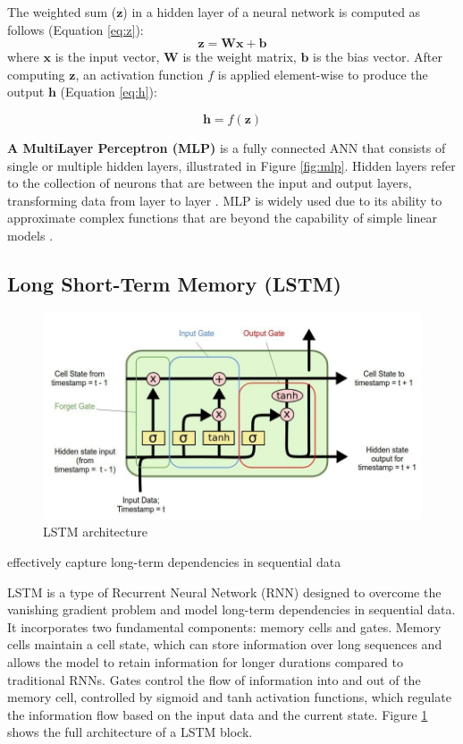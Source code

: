 The weighted sum (\( \mathbf{z} \)) in a hidden layer of a neural network is computed as follows (Equation \eqref{eq:z}):
\begin{equation}
    \label{eq:z}
    \mathbf{z} = \mathbf{W}\mathbf{x} + \mathbf{b}
\end{equation} where \( \mathbf{x} \) is the input vector, \( \mathbf{W} \) is the weight matrix, \( \mathbf{b} \) is the bias vector. After computing \( \mathbf{z} \), an activation function \( f \) is applied element-wise to produce the output \( \mathbf{h} \) (Equation \eqref{eq:h}):

\begin{equation}
    \label{eq:h}
    \mathbf{h} = f(\mathbf{z})
\end{equation}

\textbf{A MultiLayer Perceptron (MLP)} is a fully connected ANN that consists of single or multiple hidden layers, illustrated in Figure \ref{fig:mlp}. Hidden layers refer to the collection of neurons that are between the input and output layers, transforming data from layer to layer \cite{uzair-2020-hidden-layers}. MLP is widely used due to its ability to approximate complex functions that are beyond the capability of simple linear models \cite{popescue-2009-mlp}.

\subsection{Long Short-Term Memory (LSTM)}

\begin{figure}[htbp]
    \centering
    \includegraphics[width=0.8\linewidth]{images/lstm.jpeg}
    \caption{LSTM architecture \cite{rahman-2023-lstm-networks}}
    \label{fig:lstm}
\end{figure}

effectively capture long-term dependencies in sequential data

LSTM \cite{hochreiter-1997-lstm} is a type of Recurrent Neural Network (RNN) designed to overcome the vanishing gradient problem and model long-term dependencies in sequential data. It incorporates two fundamental components: memory cells and gates. Memory cells maintain a cell state, which can store information over long sequences and allows the model to retain information for longer durations compared to traditional RNNs. Gates control the flow of information into and out of the memory cell, controlled by sigmoid and tanh activation functions, which regulate the information flow based on the input data and the current state. Figure \ref{fig:lstm} shows the full architecture of a LSTM block.

